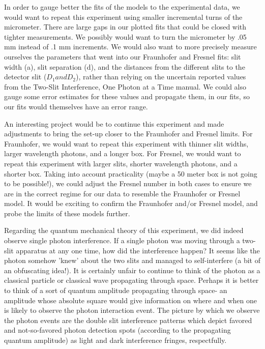 \documentclass[prb,preprint]{revtex4-1}
\begin{document}
In order to gauge better the fits of the models to the experimental data, we would want to repeat this experiment using smaller incremental turns of the micrometer.  There are large gaps in our plotted fits that could be closed with tighter measurements.  We possibly would want to turn the micrometer by .05 mm instead of .1 mm increments.  We would also want to more precisely measure ourselves the parameters that went into our Fraunhofer and Fresnel fits:  slit width (a), slit separation (d), and the distances from the different slits to the detector slit ($D_{1} and D_{2}$), rather than relying on the uncertain reported values from the Two-Slit Interference, One Photon at a Time manual.  We could also gauge some error estimates for these values and propagate them, in our fits, so our fits would themselves have an error range.

An interesting project would be to continue this experiment and made adjustments to bring the set-up closer to the Fraunhofer and Fresnel limits.  For Fraunhofer, we would want to repeat this experiment with thinner slit widths, larger wavelength photons, and a longer box.  For Fresnel, we would want to repeat this experiment with larger slits, shorter wavelength photons, and a shorter box.  Taking into account practicality (maybe a 50 meter box is not going to be possible!), we could adjust the Fresnel number in both cases to ensure we are in the correct regime for our data to resemble the Fraunhofer or Fresnel model.  It would be exciting to confirm the Fraunhofer and/or Fresnel model, and probe the limits of these models further.

Regarding the quantum mechanical theory of this experiment, we did indeed observe single photon interference.  If a single photon was moving through a two-slit apparatus at any one time, how did the interference happen?  It seems like the photon somehow 'knew' about the two slits and managed to self-interfere (a bit of an obfuscating idea!).  It is certainly unfair to continue to think of the photon as a classical particle or classical wave propagating through space.  Perhaps it is better to think of a sort of quantum amplitude propagating through space- an amplitude whose absolute square would give information on where and when one is likely to observe the photon interaction event.  The picture by which we observe the photon events are the double slit interference patterns which depict favored and not-so-favored photon detection spots (according to the propagating quantum amplitude) as light and dark interference fringes, respectfully.  \cite{teachspin}
\end{document}
